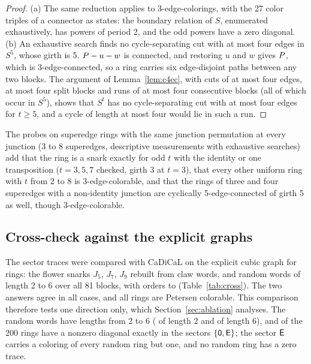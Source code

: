 \begin{proof}
(a) The same reduction applies to 3-edge-colorings, with the 27 color triples of a connector as
states: the boundary relation of $S$, enumerated exhaustively, has powers of period 2, and the odd
powers have a zero diagonal. (b) An exhaustive search finds no cycle-separating cut with at most
four edges in $S^5$, whose girth is 5. $P - u - w$ is connected, and restoring $u$ and $w$ gives
$P$, which is 3-edge-connected, so a ring carries six edge-disjoint paths between any two blocks.
The argument of Lemma~\ref{lem:c4ec}, with cuts of at most four edges, at most four split blocks
and runs of at most four consecutive blocks (all of which occur in $S^5$), shows that $S^t$ has no
cycle-separating cut with at most four edges for $t \ge 5$, and a cycle of length at most four would
lie in such a run.
\end{proof}

The probes on superedge rings with the same junction permutation at every junction (3 to 8 superedges, descriptive measurements with exhaustive searches) add that the ring is a snark
exactly for odd $t$ with the identity or one transposition ($t = 3, 5, 7$ checked, girth 3 at $t = 3$), that every other uniform ring with $t$ from 2 to 8 is 3-edge-colorable,
and that the rings of three and four superedges with a non-identity junction are cyclically 5-edge-connected of girth 5 as well, though 3-edge-colorable.

\subsection{Cross-check against the explicit graphs}\label{sec:crosscheck}



The sector traces were compared with CaDiCaL on the explicit cubic graph for \nCrossRings{} rings: the flower snarks $J_5$, $J_7$, $J_9$ rebuilt from claw words, and \nCrossRandom{} random words of
length 2 to 6 over all 81 blocks, with orders \nCrossOrderMin{} to \nCrossOrderMax{} (Table~\ref{tab:cross}). The two answers agree in all
\nCrossRings{} cases, and all \nCrossRings{} rings are Petersen colorable. This comparison therefore tests one direction only, which Section~\ref{sec:ablation} analyses. The random words have lengths from 2 to 6 (\nCrossLenTwo{} of length 2
and \nCrossLenSix{} of length 6), and \nCrossTraceE{} of the 200 rings have a nonzero diagonal exactly in the sectors $\{\mathsf{0},\mathsf{E}\}$; the sector $\mathsf{E}$ carries a coloring of every random ring but one, and no random ring has a
zero trace.
